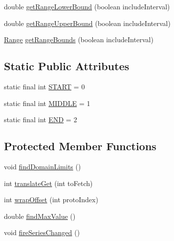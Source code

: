 \begin{DoxyCompactItemize}
\item 
double \mbox{\hyperlink{classorg_1_1jfree_1_1data_1_1time_1_1_dynamic_time_series_collection_a750bce6796644544dc4a084164e8596d}{get\+Range\+Lower\+Bound}} (boolean include\+Interval)
\item 
double \mbox{\hyperlink{classorg_1_1jfree_1_1data_1_1time_1_1_dynamic_time_series_collection_ad50df36bbe93b4ac342e1dffe79f7316}{get\+Range\+Upper\+Bound}} (boolean include\+Interval)
\item 
\mbox{\hyperlink{classorg_1_1jfree_1_1data_1_1_range}{Range}} \mbox{\hyperlink{classorg_1_1jfree_1_1data_1_1time_1_1_dynamic_time_series_collection_a3b7aac25736fd7122623ee6ae64104f7}{get\+Range\+Bounds}} (boolean include\+Interval)
\end{DoxyCompactItemize}
\subsection*{Static Public Attributes}
\begin{DoxyCompactItemize}
\item 
static final int \mbox{\hyperlink{classorg_1_1jfree_1_1data_1_1time_1_1_dynamic_time_series_collection_acc6f270d26c51df6a908fb08d99c7f47}{S\+T\+A\+RT}} = 0
\item 
static final int \mbox{\hyperlink{classorg_1_1jfree_1_1data_1_1time_1_1_dynamic_time_series_collection_aca0d552c1fe59dc1e638c0831d907632}{M\+I\+D\+D\+LE}} = 1
\item 
static final int \mbox{\hyperlink{classorg_1_1jfree_1_1data_1_1time_1_1_dynamic_time_series_collection_ad0d7ba64f400f15c297d99b6aa44f814}{E\+ND}} = 2
\end{DoxyCompactItemize}
\subsection*{Protected Member Functions}
\begin{DoxyCompactItemize}
\item 
void \mbox{\hyperlink{classorg_1_1jfree_1_1data_1_1time_1_1_dynamic_time_series_collection_a53e8bceaf2ef237920ffbddb4deae196}{find\+Domain\+Limits}} ()
\item 
int \mbox{\hyperlink{classorg_1_1jfree_1_1data_1_1time_1_1_dynamic_time_series_collection_a0d5d8b5a6a60f5d1486860e6cac7aad8}{translate\+Get}} (int to\+Fetch)
\item 
int \mbox{\hyperlink{classorg_1_1jfree_1_1data_1_1time_1_1_dynamic_time_series_collection_a968fe69ec54f5921ef43dda0db976e85}{wrap\+Offset}} (int proto\+Index)
\item 
double \mbox{\hyperlink{classorg_1_1jfree_1_1data_1_1time_1_1_dynamic_time_series_collection_a27ebe930c406f670d9ca3021374abaf6}{find\+Max\+Value}} ()
\item 
void \mbox{\hyperlink{classorg_1_1jfree_1_1data_1_1time_1_1_dynamic_time_series_collection_a72b3d61ac7ea12aefaa43303334be5cf}{fire\+Series\+Changed}} ()
\end{DoxyCompactItemize}
